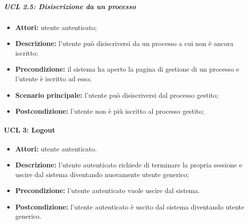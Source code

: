 \subparagraph{UCL 2.5: Disiscrizione da un processo}
\begin{itemize}
\item \textbf{Attori:} utente autenticato;
\item \textbf{Descrizione:} l'utente può disiscriversi da un processo a cui non è ancora iscritto;
\item \textbf{Precondizione:} il sistema ha aperto la pagina di gestione di un processo e l'utente è iscritto ad esso;
\item \textbf{Scenario principale:} l'utente può disiscriversi dal processo gestito;
\item \textbf{Postcondizione:} l'utente non è più iscritto al processo gestito;
\end{itemize}

\paragraph{UCL 3: Logout}
\begin{itemize}
	\item \textbf{Attori:} utente autenticato.
	\item \textbf{Descrizione:} l'utente autenticato richiede di terminare la propria sessione e uscire dal sistema diventando nuovamente utente generico;
	\item \textbf{Precondizione:} l'utente autenticato vuole uscire dal sistema.
	\item \textbf{Postcondizione:} l'utente autenticato è uscito dal sistema diventando utente generico.
\end{itemize}